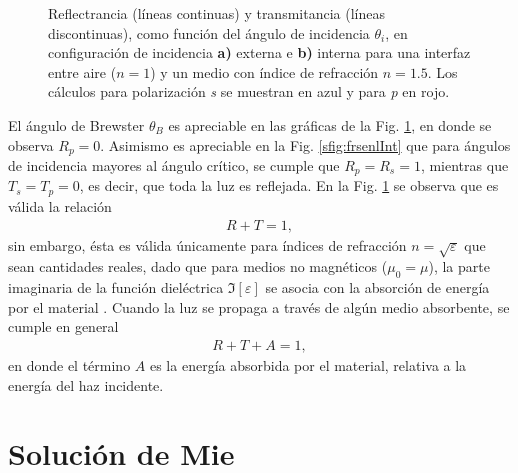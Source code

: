 \begin{figure}[h!]
\begin{subfigure}{.43\textwidth}
	\end{subfigure}\vspace*{-.7em}
	\caption{  Reflectrancia (líneas continuas) y transmitancia (líneas discontinuas), como función del ángulo de incidencia $\theta_i$, en configuración de incidencia \textbf{a)} externa e \textbf{b)} interna para una interfaz entre  aire ($n=1$) y un medio con índice de refracción $n = 1.5$. Los cálculos para polarización  \emph{s} se muestran  en azul y  para \emph{p} en rojo.}	\label{fig:frsnel}	
	\end{figure}	
%

El ángulo de Brewster $\theta_B$ es apreciable en las gráficas de la Fig. \ref{fig:frsnel}, en donde se observa $R_p = 0$. Asimismo es apreciable en la Fig. \ref{sfig:frsenlInt} que para ángulos de incidencia mayores al ángulo crítico, se cumple que $R_p = R_s = 1$, mientras que $T_s = T_p = 0$, es decir, que toda la luz es reflejada. En la Fig. \ref{fig:frsnel} se observa que es válida la relación 
	\begin{align*}
	R + T = 1,
	\end{align*}
sin embargo, ésta es válida únicamente para índices de refracción $n = \sqrt{\varepsilon}$ que sean cantidades reales, dado que para medios no magnéticos ($\mu_0 = \mu$), la parte imaginaria de la función dieléctrica $\Im[\varepsilon]$ se asocia con la absorción de energía por el material \cite{ibach2003solid}. Cuando la luz se propaga a través de algún medio absorbente, se cumple en general 
	\begin{align*}
	R + T + A = 1,
	\end{align*}
en donde el término $A$ es la energía absorbida por el material, relativa a la energía del haz incidente.

	
\section{Solución de Mie}

